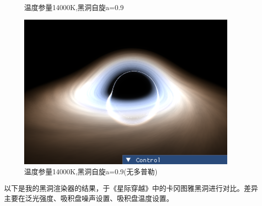 \documentclass[a4paper, 12pt]{article}
\begin{document}
\begin{figure}[H]
\begin{minipage}[t]{0.48\textwidth}
            \caption{温度参量14000K,黑洞自旋a=0.9}
        \end{minipage}
        \hfill
        \begin{minipage}[t]{0.48\textwidth}
            \centering
            \includegraphics[width=0.95\textwidth]{photo/14kT_ND.png}
            \caption{温度参量14000K,黑洞自旋a=0.9(无多普勒)}
        \end{minipage}
    \end{figure}
    以下是我的黑洞渲染器的结果，于《星际穿越》中的卡冈图雅黑洞进行对比。差异
    主要在泛光强度、吸积盘噪声设置、吸积盘温度设置。
\end{document}
